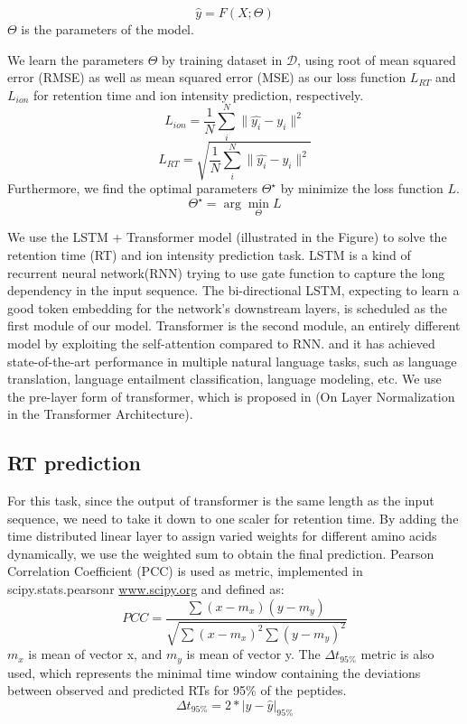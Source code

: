 \documentclass[final]{cvpr}
\begin{document}
\[ \hat{y} = F(X;\Theta) \]
$\Theta$ is the parameters of the model.

We learn the parameters $\Theta$ by training dataset in $\mathcal{D}$, using root of mean squared error (RMSE) as well as mean squared 
error (MSE)
as our loss function \( L_{RT} \) and \( L_{ion} \) for retention time and ion intensity prediction, respectively.
\[ L_{ion} = \frac{1}{N}\sum_{i}^N\|\hat{y_{i}} - y_{i}\|^2 \]
\[ L_{RT} = \sqrt{\frac{1}{N}\sum_{i}^N\|\hat{y_{i}} - y_{i}\|^2} \]
Furthermore, we find the optimal parameters \( \Theta^\star\) by minimize the loss function \( L \).
\[ \Theta^\star = \arg\min_{\Theta} L \]


We use the LSTM + Transformer model (illustrated in the Figure) to solve the retention time (RT) and ion intensity prediction task. 
LSTM is a kind of recurrent neural network(RNN) trying to use gate function to capture the long dependency in the input sequence. 
The bi-directional LSTM, expecting to learn a good token embedding for the network's downstream layers, is scheduled as the first module
of our model. Transformer is the second module, an entirely different model by exploiting the self-attention compared to RNN. 
and it has achieved state-of-the-art performance in multiple natural language tasks, such as language translation, language 
entailment classification, language modeling, etc. We use the pre-layer form of transformer, which is proposed in (On Layer
Normalization in the Transformer Architecture).

\subsection*{RT prediction}

For this task, since the output of transformer is the same length as the input sequence, we need to take it down to one scaler for 
retention time. By adding the time distributed linear layer to assign varied weights for different amino acids dynamically,
we use the weighted sum to obtain the final prediction. 
Pearson Correlation Coefficient (PCC) is used as metric, implemented in scipy.stats.pearsonr 
\url{www.scipy.org} and defined as:
\[ PCC = \frac{\sum{(x-m_{x})(y-m_{y})}}{\sqrt{\sum{(x-m_{x})^2\sum{(y-m_{y})^2}}}}\]
$m_{x}$ is mean of vector x, and $m_{y}$ is mean of vector y.
The $\Delta$$t_{95\%}$ metric is also used, which represents 
the minimal time window containing the deviations between observed and predicted RTs for 95\% of 
the peptides. 
\[ \Delta t_{95\%} = 2 * | y - \hat{y} |_{95\%} \]
\end{document}
